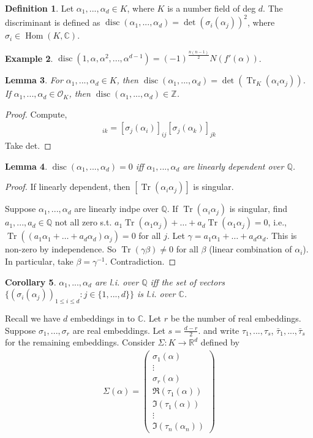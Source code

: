 \documentclass{article}
\theoremstyle{definition}
\newtheorem{defn}{Definition}[section]
\newtheorem{example}[defn]{Example}
\theoremstyle{remark}
\theoremstyle{plain}
\newtheorem{lem}[defn]{Lemma}
\newtheorem{crly}[defn]{Corollary}
\newcommand{\ZZ}{\mathbb{Z}}
\newcommand{\QQ}{\mathbb{Q}}
\newcommand{\RR}{\mathbb{R}}
\newcommand{\CC}{\mathbb{C}}
\newcommand{\Hom}{\operatorname{Hom}}
\newcommand{\tr}{\operatorname{Tr}}
\newcommand{\disc}{\operatorname{disc}}
\begin{document}
\begin{defn}
    Let $\alpha_1,...,\alpha_d\in K$, where $K$ is a number field of deg $d$. The discriminant is defined as $\disc(\alpha_1,...,\alpha_d)=\det(\sigma_i(\alpha_j))^2$, where $\sigma_i\in\Hom(K,\CC)$.
\end{defn}
\begin{example}
    $\disc(1,\alpha,\alpha^2,...,\alpha^{d-1})=(-1)^{\frac{n(n-1)}{2}}N(f'(\alpha))$.
\end{example}
\begin{lem}
    For $\alpha_1,...,\alpha_d\in K$, then
    $\disc(\alpha_1,...,\alpha_d)=\det(\tr_K(\alpha_i\alpha_j))$. If $\alpha_1,...,\alpha_d\in\mathcal O_K$, then $\disc(\alpha_1,...,\alpha_d)\in\ZZ$.
\end{lem}
\begin{proof}
    Compute,
    \begin{align*}
        [\tr(\alpha_i\alpha_k)]_{ik}=[\sigma_j(\alpha_i)]_{ij}[\sigma_{j}(\alpha_k)]_{jk}
    \end{align*}
    Take det.
\end{proof}
\begin{lem}
    $\disc(\alpha_1,...,\alpha_d)=0$ iff $\alpha_1,...,\alpha_d$ are linearly dependent over $\QQ$.
\end{lem}
\begin{proof}
    If linearly dependent, then $[\tr(\alpha_i\alpha_j)]$ is singular. 
    
    Suppose $\alpha_1,...,\alpha_d$ are linearly indpe over $\QQ$. If $\tr(\alpha_i\alpha_j)$ is singular, find $a_1,...,a_d\in\QQ$ not all zero s.t. $a_1\tr(\alpha_1\alpha_j)+\ldots+a_d\tr(\alpha_1\alpha_j)=0$, i.e., $\tr((a_1\alpha_1+\ldots+a_d\alpha_d)\alpha_j)=0$ for all $j$. Let $\gamma=a_1\alpha_1+\ldots+a_d\alpha_d$. This is non-zero by independence. So $\tr(\gamma\beta)\neq 0$ for all $\beta$ (linear combination of $\alpha_i$). In particular, take $\beta=\gamma^{-1}$. Contradiction.
\end{proof}
\begin{crly}
    $\alpha_1,...,\alpha_d$ are l.i. over $\QQ$ iff the set of vectors $\{(\sigma_i(\alpha_j))_{1\le i\le d}:j\in\{1,...,d\}\}$ is l.i. over $\CC$.
\end{crly}
Recall we have $d$ embeddings in to $\CC$. Let $r$ be the number of real embeddings. Suppose $\sigma_1,...,\sigma_r$ are real embeddings. Let $s=\frac{d-r}{2}$. and write $\tau_1,...,\tau_s$, $\bar\tau_1,...,\bar\tau_s$ for the remaining embeddings. Consider $\Sigma:K\to\RR^d$ defined by
\begin{align*}
    \Sigma(\alpha)=\begin{pmatrix}
        \sigma_1(\alpha)\\ \vdots\\ \sigma_r(\alpha)\\ \Re(\tau_1(\alpha))\\ \Im(\tau_1(\alpha))\\\vdots\\ \Im(\tau_n(\alpha_n))
    \end{pmatrix}
\end{align*}
\end{document}
